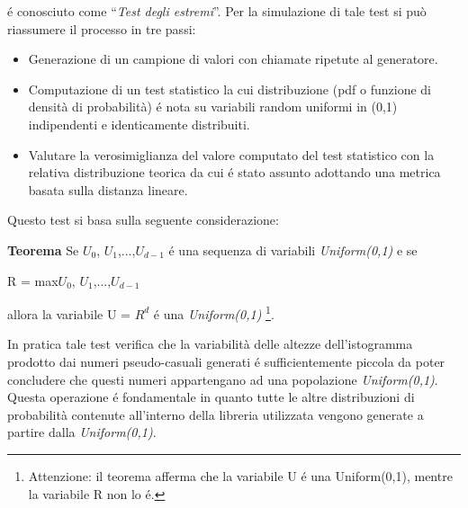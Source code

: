 \noindent \'e conosciuto come ``\textit{Test degli estremi}''. 
Per la simulazione di tale test si pu\`o riassumere il processo in tre passi:
\begin{itemize}
 \item Generazione di un campione di valori con chiamate ripetute al generatore.
 \item Computazione di un test statistico la cui distribuzione (pdf o funzione 
di densit\`a di probabilit\`a) \'e nota su variabili random uniformi in (0,1) indipendenti e identicamente 
distribuiti.
 \item Valutare la verosimiglianza del valore computato del test statistico con 
la relativa distribuzione
 teorica da cui \'e stato assunto adottando una metrica basata sulla distanza 
lineare.
\end{itemize}

Questo test si basa sulla seguente considerazione:

\vspace{0.5cm} \noindent \textbf{Teorema} Se $U_{0}^{}$, 
$U_{1}^{}$,...,$U_{d-1}^{}$ \'e una sequenza di variabili \textit{Uniform(0,1)} e 
se 

\begin{center}R = max{$U_{0}^{}$, $U_{1}^{}$,...,$U_{d-1}^{}$} \end{center} 

\noindent allora la variabile U = $R_{}^{d}$ \'e una \textit{Uniform(0,1)} 
\footnote{Attenzione: il teorema afferma che la variabile U \'e una Uniform(0,1), 
mentre la variabile R non lo \'e.}.

In pratica tale test verifica che la variabilit\`a delle altezze dell'istogramma 
prodotto dai numeri pseudo-casuali generati \'e sufficientemente piccola da poter 
concludere che questi numeri appartengano ad una popolazione 
\textit{Uniform(0,1)}. Questa operazione \'e fondamentale in quanto tutte le 
altre distribuzioni di probabilit\`a contenute all'interno della libreria 
utilizzata vengono generate a partire dalla \textit{Uniform(0,1)}.

